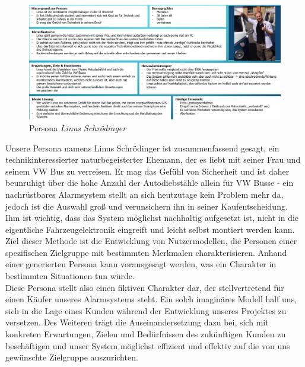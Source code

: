 \begin{figure} [H]
	\begin{center}
		\includegraphics[width=1\textwidth]{Bilder/Konzept_Persona.png}
		\caption{Persona \textit{Linus Schrödinger}}
		\label{persona}
	\end{center}
\end{figure}
Unsere Persona namens Linus Schrödinger ist zusammenfassend gesagt, ein technikinteressierter naturbegeisterter Ehemann, der es liebt mit seiner Frau und seinem VW Bus zu verreisen. Er mag das Gefühl von Sicherheit und ist daher beunruhigt über die hohe Anzahl der Autodiebstähle allein für VW Busse - ein nachrüstbares Alarmsystem stellt an sich heutzutage kein Problem mehr da, jedoch ist die Auswahl groß und verunsichern ihn in seiner Kaufentscheidung. Ihm ist wichtig, dass das System möglichst nachhaltig aufgesetzt ist, nicht in die eigentliche Fahrzeugelektronik eingreift und leicht selbst montiert werden kann.
\\
Ziel dieser Methode ist die Entwicklung von Nutzermodellen, die Personen einer spezifischen Zielgruppe mit bestimmten Merkmalen charakterisieren. Anhand einer generierten Persona kann vorausgesagt werden, was ein Charakter in bestimmten Situationen tun würde. \cite{JosefineLepzien}
\\
Diese Persona stellt also einen fiktiven Charakter dar, der stellvertretend für einen Käufer unseres Alarmsystems steht. Ein solch imaginäres Modell half uns, sich in die Lage eines Kunden während der Entwicklung unseres Projektes zu versetzen. Des Weiteren trägt die Auseinandersetzung dazu bei, sich mit konkreten Erwartungen, Zielen und Bedürfnissen des zukünftigen Kunden zu beschäftigen und unser System möglichst effizient und effektiv auf die von uns gewünschte Zielgruppe auszurichten.



